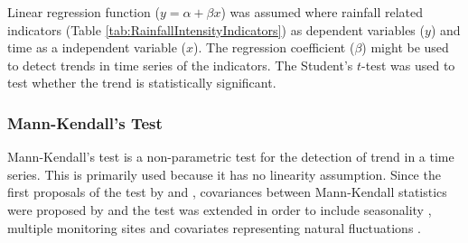 %


Linear regression function ($y=\alpha + \beta x$) was assumed where rainfall
related indicators (Table \ref{tab:RainfallIntensityIndicators}) as dependent
variables ($y$) and time as a independent variable ($x$). The regression
coefficient ($\beta$) might be used to detect trends in time series of the
indicators. The Student's $t$-test was used to test whether the trend is
statistically significant.



\subsubsection{Mann-Kendall's Test}
\label{sec:MannKendallSTest}

Mann-Kendall's test is a non-parametric test for the detection of trend in a
time series. This is primarily used because it has no linearity assumption.
Since the first proposals of the test by \citet{mann1945-245} and
\citet{kendall1975-202}, covariances between Mann-Kendall statistics were
proposed by \citet{dietz1981-169} and the test was extended in order to include
seasonality \citep{hirsch1984-727}, multiple monitoring sites
\citep{lettenmaier1988-505} and covariates representing natural fluctuations
\citep{libiseller2002-71}.


